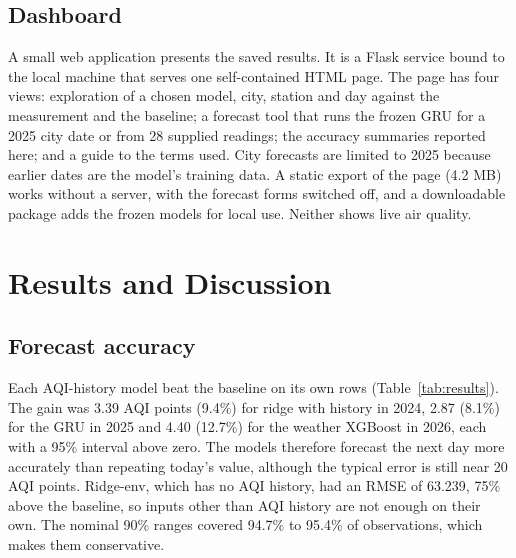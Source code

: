 \documentclass[pdflatex,sn-mathphys-num]{sn-jnl}
\begin{document}
\subsection{Dashboard}
A small web application presents the saved results. It is a Flask service bound to the local machine that serves one self-contained HTML page. The page has four views: exploration of a chosen model, city, station and day against the measurement and the baseline; a forecast tool that runs the frozen GRU for a 2025 city date or from 28 supplied readings; the accuracy summaries reported here; and a guide to the terms used. City forecasts are limited to 2025 because earlier dates are the model's training data. A static export of the page (4.2 MB) works without a server, with the forecast forms switched off, and a downloadable package adds the frozen models for local use. Neither shows live air quality.

\section{Results and Discussion}\label{sec:results}

\subsection{Forecast accuracy}
Each AQI-history model beat the baseline on its own rows (Table~\ref{tab:results}). The gain was 3.39 AQI points (9.4\%) for ridge with history in 2024, 2.87 (8.1\%) for the GRU in 2025 and 4.40 (12.7\%) for the weather XGBoost in 2026, each with a 95\% interval above zero. The models therefore forecast the next day more accurately than repeating today's value, although the typical error is still near 20 AQI points. Ridge-env, which has no AQI history, had an RMSE of 63.239, 75\% above the baseline, so inputs other than AQI history are not enough on their own. The nominal 90\% ranges covered 94.7\% to 95.4\% of observations, which makes them conservative.
\end{document}
